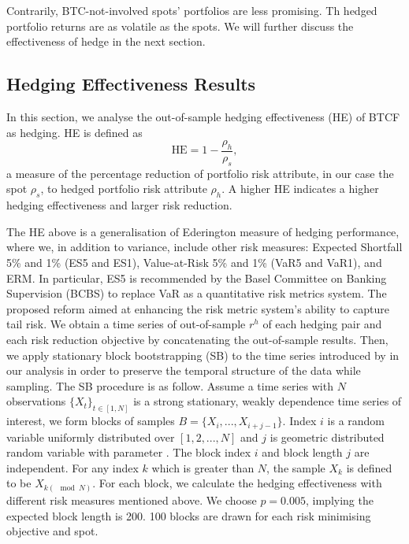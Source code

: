 Contrarily, BTC-not-involved spots' portfolios are less promising.
Th hedged portfolio returns are as volatile as the spots.
We will further discuss the effectiveness of hedge in the next section. %

%
%
%
%
%
%



\subsection{Hedging Effectiveness Results}\label{sec: HE results}
In this section, we analyse the out-of-sample hedging effectiveness (HE) of BTCF as hedging.
HE is defined as $$\text{HE} = 1-\frac{\rho_h}{\rho_s},$$
a measure of the percentage reduction of portfolio risk attribute, in our case the spot $\rho_s$,
to hedged portfolio risk attribute $\rho_h$.
A higher HE indicates a higher hedging effectiveness and larger risk reduction. \medskip

The HE above is a generalisation of Ederington measure of hedging performance, where we,
in addition to variance, include other risk measures: Expected Shortfall 5\% and 1\% (ES5 and ES1), Value-at-Risk 5\% and 1\% (VaR5 and VaR1), and ERM.
In particular, ES5 is recommended by the Basel Committee on Banking Supervision (BCBS) to replace VaR as a quantitative risk metrics system.
The proposed reform aimed at enhancing the risk metric system's ability to capture tail risk. \medskip
%
We obtain a time series of out-of-sample $r^h$ of each hedging pair and each risk reduction objective by concatenating the out-of-sample results.
Then, we apply stationary block bootstrapping (SB) to the time series introduced by \cite{Politis1994} in our analysis in order to preserve the temporal structure of the data while sampling.
The SB procedure is as follow.
Assume a time series with $N$ observations $\{X_t\}_{t \in [1,N]}$ is a strong stationary, weakly dependence time series of interest,
we form blocks of samples $B = \{X_i, ..., X_{i+j-1}\}$.
Index $i$ is a random variable uniformly distributed over $[1,2,...,N]$ and $j$ is geometric distributed random variable with parameter .
The block index $i$ and block length $j$ are independent.
For any index $k$ which is greater than $N$, the sample $X_k$ is defined to be $X_{k(\mod N)}$.
For each block, we calculate the hedging effectiveness with different risk measures mentioned above.
We choose $p=0.005$, implying the expected block length is 200.
100 blocks are drawn for each risk minimising objective and spot. \medskip

